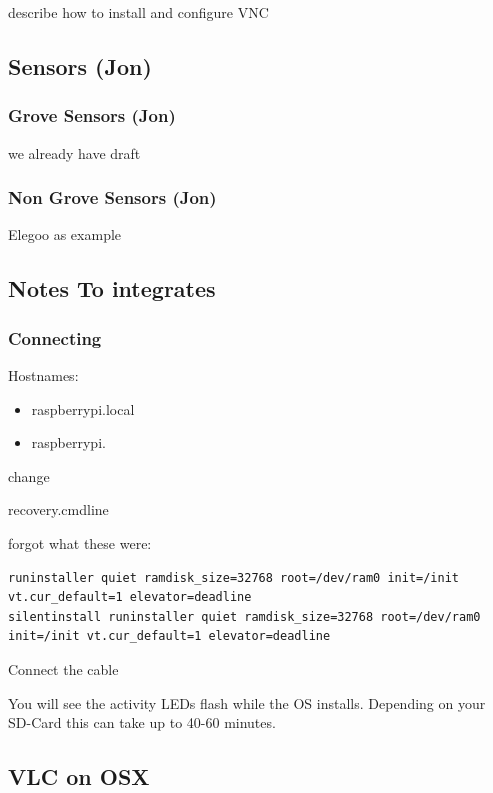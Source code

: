 describe how to install and configure VNC

\subsection{Sensors (Jon)}\label{sensors-jon}

\subsubsection{Grove Sensors (Jon)}\label{grove-sensors-jon}

we already have draft

\subsubsection{Non Grove Sensors (Jon)}\label{non-grove-sensors-jon}

Elegoo as example

\subsection{Notes To integrates}\label{notes-to-integrates}

\subsubsection{Connecting}\label{connecting}

Hostnames:

\begin{itemize}
\tightlist
\item
  raspberrypi.local
\item
  raspberrypi.
\end{itemize}

change

recovery.cmdline

forgot what these were:

\begin{verbatim}
runinstaller quiet ramdisk_size=32768 root=/dev/ram0 init=/init vt.cur_default=1 elevator=deadline
silentinstall runinstaller quiet ramdisk_size=32768 root=/dev/ram0 init=/init vt.cur_default=1 elevator=deadline
\end{verbatim}

Connect the cable

You will see the activity LEDs flash while the OS installs. Depending on
your SD-Card this can take up to 40-60 minutes.

\subsection{VLC on OSX}\label{vlc-on-osx}

